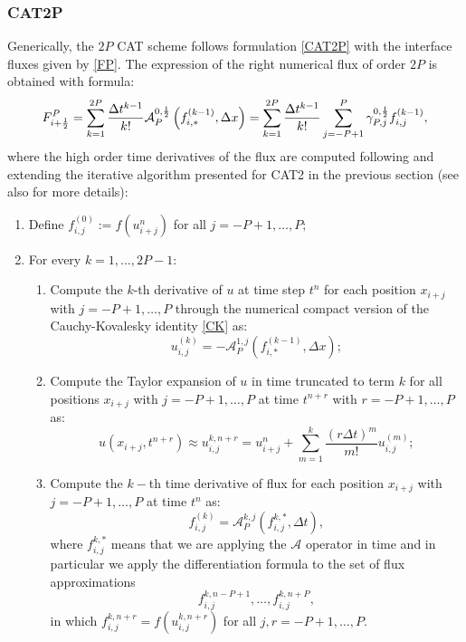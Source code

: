 \subsubsection{CAT2P}
Generically, the $2P$ CAT scheme follows formulation \eqref{CAT2P} with the interface fluxes given by \eqref{FP}.
The expression of the right numerical flux of order $2P$ is obtained with formula:
\begin{equation}
    \label{FP+}
    F^P_{i+\frac{1}{2}} = \sum_{k=1}^{2P}\frac{\Delta t^{k-1}}{k!}\mathcal{A}^{0,\frac{1}{2}}_{P}\left(f_{i,*}^{(k-1)},\Delta x\right) = \sum_{k=1}^{2P}\frac{\Delta t^{k-1}}{k!}\sum_{j=-P+1}^P \gamma^{0,\frac{1}{2}}_{P,j}f_{i,j}^{(k-1)}, 
\end{equation}
where the high order time derivatives of the flux are computed following and extending the iterative algorithm presented for CAT2 in the previous section (see also \cite{Carrillo-Pares, CPZMR2020, Macca-Pares} for more details):
\begin{enumerate}
    \item Define $f^{(0)}_{i,j} := f(u_{i+j}^n)$ for all $j = -P+1,\ldots,P;$
    \item For every $k = 1,\ldots,2P-1$:
    \begin{enumerate}
        \item Compute the $k$-th derivative of $u$ at time step $t^n$ for each position $x_{i+j}$ with $j = -P+1,\ldots,P$ through the numerical compact version of the Cauchy-Kovalesky identity \eqref{CK}  as:
        $$u_{i,j}^{(k)} = -\mathcal{A}^{1,j}_{P}\left(f_{i,*}^{(k-1)},\Delta x\right); $$
        \item Compute the Taylor expansion of $u$ in time truncated to term $k$ for all positions $x_{i+j}$ with $j = -P+1,\ldots, P$ at time $t^{n+r}$ with $r = -P+1,\ldots,P$ as:
        $$u(x_{i+j},t^{n+r}) \approx u_{i,j}^{k,n+r} = u^n_{i+j} +\sum_{m=1}^k\frac{(r\Delta t)^m}{m!} u^{(m)}_{i,j}; $$
        \item Compute the $k-$th time derivative of flux for each position $x_{i+j}$ with $j = -P+1,\ldots, P$ at time $t^{n}$ as:
        $$f^{(k)}_{i,j} = \mathcal{A}^{k,j}_{P}\left(f_{i,j}^{k,*},\Delta t\right), $$ where $f_{i,j}^{k,*}$ means that we are applying the $\mathcal{A}$ operator in time and in particular we apply the differentiation formula to the set of flux approximations 
        $$ f_{i,j}^{k,n-P+1},\ldots,f_{i,j}^{k,n+P},$$ 
        in which $f_{i,j}^{k,n+r}=f\left(u_{i,j}^{k,n+r}\right)$ for all $j,r =-P+1,\ldots,P$.
    \end{enumerate}
\end{enumerate}

